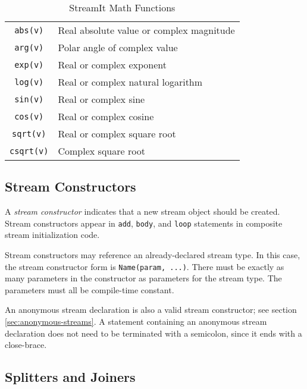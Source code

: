 \documentclass[11pt]{article}
\begin{document}
\begin{table}[htbp]
  \begin{center}
    \begin{tabular}{cl}
      \toprule
      \texttt{abs(v)} & Real absolute value or complex magnitude \\
      \texttt{arg(v)} & Polar angle of complex value \\
      \texttt{exp(v)} & Real or complex exponent \\
      \texttt{log(v)} & Real or complex natural logarithm \\
      \texttt{sin(v)} & Real or complex sine \\
      \texttt{cos(v)} & Real or complex cosine \\
      \texttt{sqrt(v)} & Real or complex square root \\
      \texttt{csqrt(v)} & Complex square root \\
      \bottomrule
    \end{tabular}
    \caption{StreamIt Math Functions}
    \label{tab:math-functions}
  \end{center}
\end{table}

\subsection{Stream Constructors}
\label{sec:expr-stream-constructor}

A \emph{stream constructor} indicates that a new stream object should
be created.  Stream constructors appear in \lstinline|add|,
\lstinline|body|, and \lstinline|loop| statements in composite stream
initialization code.

Stream constructors may reference an already-declared stream type.  In
this case, the stream constructor form is \lstinline|Name(param, ...)|.
There must be exactly as many parameters in the constructor as
parameters for the stream type.  The parameters must all be
compile-time constant.

An anonymous stream declaration is also a valid stream constructor;
see section \ref{sec:anonymous-streams}.  A statement containing an
anonymous stream declaration does not need to be terminated with a
semicolon, since it ends with a close-brace.

\subsection{Splitters and Joiners}
\label{sec:expr-splitters-joiners}
\end{document}
